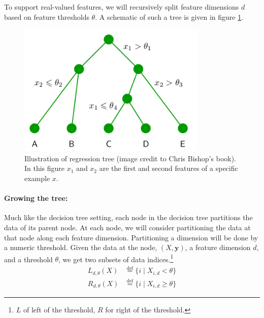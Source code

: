 \documentclass[11pt]{article}
\newcommand{\defeq}{\overset{\text{def}}{=}}
\begin{document}
\noindent To support real-valued features, we will recursively split feature
dimensions $d$ based on feature thresholds $\theta$.  A schematic of such a tree
is given in figure \ref{fig:regression-tree}.

\begin{figure}\centering
    \includegraphics[width=90mm]{regression-tree.png}
    \caption{Illustration of regression tree (image credit to Chris Bishop's
      book). In this figure $x_1$ and $x_2$ are the first and second features of
      a specific example $x$.}
    \label{fig:regression-tree}
\end{figure}

\paragraph{Growing the tree:}
Much like the decision tree setting, each node in the decision tree partitions
the data of its parent node.  At each node, we will consider partitioning the
data at that node along each feature dimension.  Partitioning a dimension will
be done by a numeric threshold. Given the data at the node, $(X, \boldsymbol{y})$, a feature
dimension $d$, and a threshold $\theta$, we get two subsets of data indices.\footnote{$L$ of left of the threshold, $R$ for right of the threshold.}
%
\begin{align}\label{eq:split-set}
  L_{d,\theta}(X) &\defeq \{ i \mid X_{i,d} < \theta \} \\
  R_{d,\theta}(X) &\defeq \{ i \mid X_{i,d} \ge \theta \}
\end{align}
\end{document}
